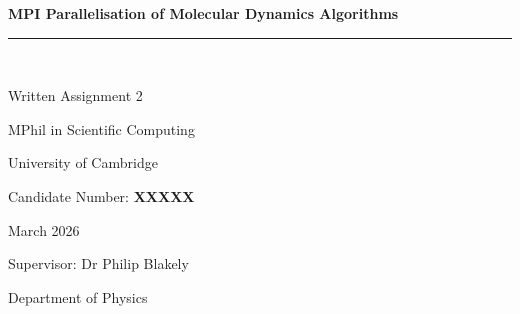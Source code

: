 \documentclass[10pt,twocolumn]{article}
\begin{document}
\hypersetup{pageanchor=false}

\onecolumn
\thispagestyle{empty}

\begin{center}
  \vspace*{1.4cm}
  {\LARGE\bfseries MPI Parallelisation of Molecular Dynamics Algorithms\par}
  \vspace{0.7cm}
  \rule{0.62\textwidth}{0.5pt}\\[0.45cm]
  {\large Written Assignment 2\par}
  {\large MPhil in Scientific Computing\par}
  {\large University of Cambridge\par}
  \vspace{0.8cm}
  {\large Candidate Number: \textbf{XXXXX}\par}
  \vspace{0.35cm}
  {\large March 2026\par}
  \vspace{0.55cm}
  {\normalsize Supervisor: Dr Philip Blakely\par}
  {\normalsize Department of Physics\par}
\end{center}

\vfill
\clearpage

\thispagestyle{empty}
\end{document}
